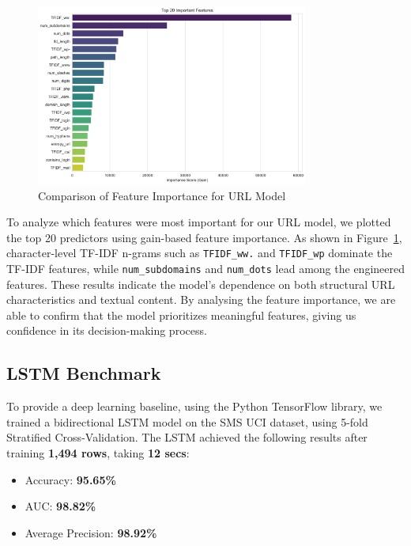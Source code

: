 \documentclass{article}
\begin{document}
\begin{figure}[htbp]
    \centering
    \includegraphics[width=0.8\textwidth]{../analysis/url/feature_importance.png}
    \caption{Comparison of Feature Importance for URL Model}
    \label{fig:feature_importance_1}
\end{figure}

\noindent
To analyze which features were most important for our URL model, we plotted the top 20 predictors using gain-based feature importance. As shown in Figure~\ref{fig:feature_importance_1}, character-level TF-IDF n-grams such as \texttt{TFIDF\_ww.} and \texttt{TFIDF\_wp} dominate the TF-IDF features, while \texttt{num\_subdomains} and \texttt{num\_dots} lead among the engineered features. These results indicate the model's dependence on both structural URL characteristics and textual content. By analysing the feature importance, we are able to confirm that the model prioritizes meaningful features, giving us confidence in its decision-making process.

\subsection{LSTM Benchmark}

\noindent
To provide a deep learning baseline, using the Python TensorFlow library, we trained a bidirectional LSTM model on the SMS UCI dataset, using 5-fold Stratified Cross-Validation. The LSTM achieved the following results after training \textbf{1,494 rows}, taking \textbf{12 secs}:

\begin{itemize}
    \item Accuracy: \textbf{95.65\%}
    \item AUC: \textbf{98.82\%}
    \item Average Precision: \textbf{98.92\%}
\end{itemize}
\end{document}
